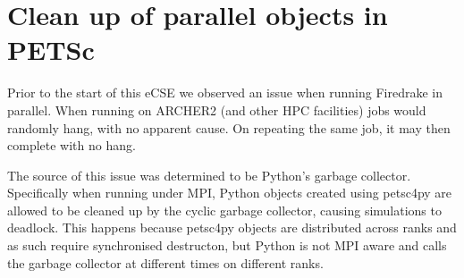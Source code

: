 \documentclass[a4paper,11pt]{article}
\begin{document}
%
%
%
%
%


\section{Clean up of parallel objects in PETSc}
\label{sec:other}
Prior to the start of this eCSE we observed an issue when running Firedrake in parallel.
When running on ARCHER2 (and other HPC facilities) jobs would randomly hang, with no apparent cause.
On repeating the same job, it may then complete with no hang.

The source of this issue was determined to be Python's garbage collector.
Specifically when running under MPI, Python objects created using petsc4py are allowed to be cleaned up by the cyclic garbage collector, causing simulations to deadlock.
This happens because petsc4py objects are distributed across ranks and as such require synchronised destructon, but Python is not MPI aware and calls the garbage collector at different times on different ranks.
\end{document}
